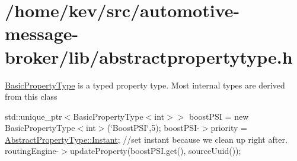 \hypertarget{_2home_2kev_2src_2automotive-message-broker_2lib_2abstractpropertytype_8h-example}{\section{/home/kev/src/automotive-\/message-\/broker/lib/abstractpropertytype.\+h}
}
\hyperlink{classBasicPropertyType}{Basic\+Property\+Type} is a typed property type. Most internal types are derived from this class

std\+::unique\+\_\+ptr$<$Basic\+Property\+Type$<$int$>$$>$ boost\+P\+S\+I = new Basic\+Property\+Type$<$int$>$(\char`\"{}\+Boost\+P\+S\+I\char`\"{},5); boost\+P\+S\+I-\/$>$priority = \hyperlink{classAbstractPropertyType_a1e513f66eb2dd2bd2cddbec16422af63a5ef5703d3d1af9d204d6d2f3cf41569a}{Abstract\+Property\+Type\+::\+Instant}; //set instant because we clean up right after. routing\+Engine-\/$>$update\+Property(boost\+P\+S\+I.\+get(), source\+Uuid());


\begin{DoxyCodeInclude}
\end{DoxyCodeInclude}
 